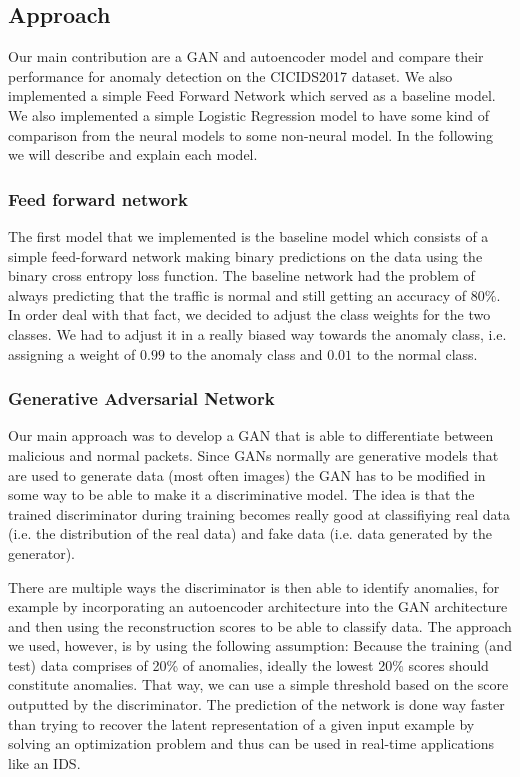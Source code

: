 \documentclass[]{article}
\begin{document}
	 \subsection{Approach}

	 Our main contribution are a GAN and autoencoder model and compare their performance for anomaly detection on the CICIDS2017 dataset. We also implemented  a simple Feed Forward Network which served as a baseline model. We also implemented a simple Logistic Regression model to have some kind of comparison from the neural models to some non-neural model. In the following we will describe and explain each model.

	 
		
	  \subsubsection{Feed forward network}
	 The first model that we implemented is the baseline model which consists of a simple feed-forward network making binary predictions on the data using the binary cross entropy loss function. The baseline network had the problem of always predicting that the traffic is normal and still getting an accuracy of $80\%$. In order deal with that fact, we decided to adjust the class weights for the two classes. We had to adjust it in a really biased way towards the anomaly class, i.e. assigning a weight of $0.99$ to the anomaly class and $0.01$ to the normal class. 

	 
	 
	\subsubsection{Generative Adversarial Network}
	 Our main approach was to develop a GAN that is able to differentiate between malicious and normal packets. Since GANs normally are generative models that are used to generate data (most often images) the GAN has to be modified in some way to be able to make it a discriminative model.  The idea is that the trained discriminator during training becomes really good at classifiying real data (i.e. the distribution of the real data) and fake data (i.e. data generated by the generator). 
	 \newline
	 
	 \noindent
	 There are multiple ways the discriminator is then able to identify anomalies, for example by incorporating an autoencoder architecture into the GAN architecture and then using the reconstruction scores to be able to classify data. The approach we used, however, is by using the following assumption: Because the training (and test) data comprises of 20\% of anomalies, ideally the lowest 20\% scores should constitute anomalies. That way, we can use a simple threshold based on the score outputted by the discriminator. The prediction of the network is done way faster than trying to recover the latent representation of a given input example by solving an optimization problem and thus can be used in real-time applications like an IDS.
	
\end{document}
